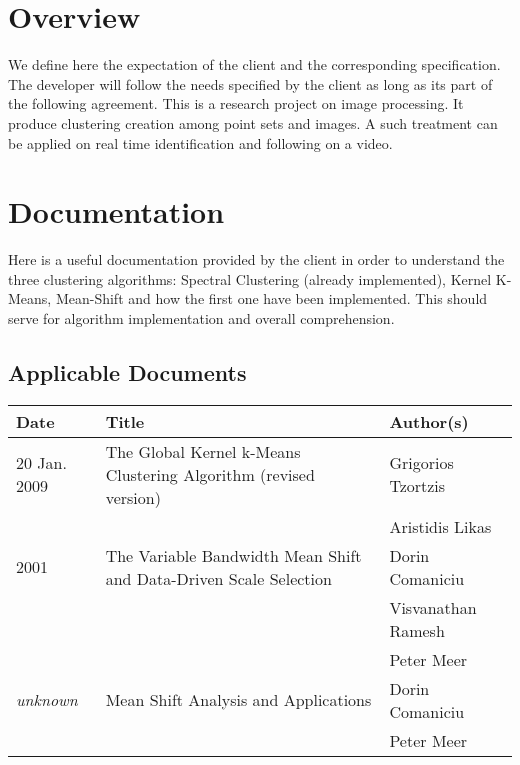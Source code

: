 \section{Overview}
We define here the expectation of the client and the corresponding specification. The developer will follow the needs specified by the client as long as its part of the following agreement. This is a research project on image processing. It produce clustering creation among point sets and images.
A such treatment can be applied on real time identification and following on a video.
\section{Documentation}
Here is a useful documentation provided by the client in order to understand the three clustering algorithms: Spectral Clustering (already implemented), Kernel K-Means, Mean-Shift and how the first one have been implemented. This should serve for algorithm implementation and overall comprehension.
\subsection{Applicable Documents}
\begin{center}
    \begin{tabular}{ | p{} | l | p{} |}
    \hline
    \textbf{Date} & \textbf{Title} & \textbf{Author(s)}
    \\
    \hline
    20 Jan. 2009 & The Global Kernel k-Means Clustering Algorithm (revised version) & Grigorios Tzortzis
    \\ & & Aristidis Likas
    \\ 
    \hline
    2001 & The Variable Bandwidth Mean Shift and Data-Driven Scale Selection & Dorin Comaniciu
    \\ & & Visvanathan Ramesh
    \\ & & Peter Meer
    \\ 
    \hline
    \textit{unknown}& Mean Shift Analysis and Applications & Dorin Comaniciu
    \\ & & Peter Meer
    \\
    \hline
    \end{tabular}
\end{center}
